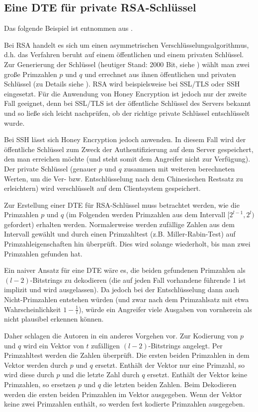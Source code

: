 \subsection{Eine DTE für private RSA-Schlüssel}
\label{sec:dte-rsa}

Das folgende Beispiel ist entnommen aus \cite{EURO2014}.

Bei RSA handelt es sich um einen asymmetrischen Verschlüsselungsalgorithmus, d.h. das Verfahren beruht auf einem öffentlichen und einem privaten Schlüssel. Zur Generierung der Schlüssel (heutiger Stand: 2000 Bit, siehe \cite{BSI2014}) wählt man zwei große  Primzahlen \(p\) und \(q\) und errechnet aus ihnen öffentlichen und privaten Schlüssel (zu Details siehe \cite{Schneier2006}). RSA wird beispielsweise bei SSL/TLS oder SSH eingesetzt. Für die Anwendung von Honey Encryption ist jedoch nur der zweite Fall geeignet, denn bei SSL/TLS ist der öffentliche Schlüssel des Servers bekannt und so ließe sich leicht nachprüfen, ob der richtige private Schlüssel entschlüsselt wurde. 

Bei SSH lässt sich Honey Encryption jedoch anwenden. In diesem Fall wird der öffentliche Schlüssel zum Zweck der Authentifizierung auf dem Server gespeichert, den man erreichen möchte (und steht somit dem Angreifer nicht zur Verfügung). Der private Schlüssel (genauer \(p\) und \(q\) zusammen mit weiteren berechneten Werten, um die Ver- bzw. Entschlüsselung nach dem Chinesischen Restsatz zu erleichtern) wird verschlüsselt auf dem Clientsystem gespeichert.

Zur Erstellung einer DTE für RSA-Schlüssel muss betrachtet werden, wie die Primzahlen \(p\) und \(q\) (im Folgenden werden Primzahlen aus dem Intervall \([2^{l-1},2^l)\) gefordert) erhalten werden. Normalerweise werden zufällige Zahlen aus dem Intervall gewählt und durch einen Primzahltest (z.B. Miller-Rabin-Test) auf Primzahleigenschaften hin überprüft. Dies wird solange wiederholt, bis man zwei Primzahlen gefunden hat. 

Ein naiver Ansatz für eine DTE wäre es, die beiden gefundenen Primzahlen als \((l-2)\)-Bitstrings zu dekodieren (die auf jeden Fall vorhandene führende 1 ist implizit und wird ausgelassen). Da jedoch bei der Entschlüsselung dann auch Nicht-Primzahlen entstehen würden (und zwar nach dem Primzahlsatz mit etwa Wahrscheinlichkeit \(1-\frac{1}{l}\)), würde ein Angreifer viele Ausgaben von vornherein als nicht plausibel erkennen können.

Daher schlagen die Autoren in \cite{EURO2014} ein anderes Vorgehen vor. Zur Kodierung von \(p\) und \(q\) wird ein Vektor von \(t\) zufälligen \((l-2)\)-Bitstrings angelegt. Per Primzahltest werden die Zahlen überprüft. Die ersten beiden Primzahlen in dem Vektor werden durch \(p\) und \(q\) ersetzt. Enthält der Vektor nur eine Primzahl, so wird diese durch \(p\) und die letzte Zahl durch \(q\) ersetzt. Enthält der Vektor keine Primzahlen, so ersetzen \(p\) und \(q\) die letzten beiden Zahlen. Beim Dekodieren werden die ersten beiden Primzahlen im Vektor ausgegeben. Wenn der Vektor keine zwei Primzahlen enthält, so werden fest kodierte Primzahlen ausgegeben.

